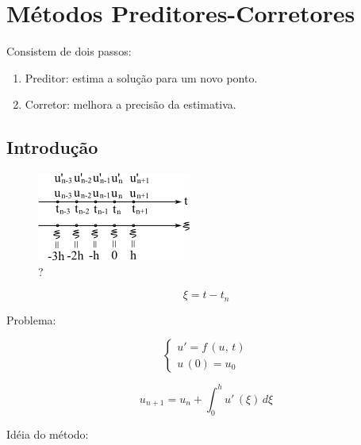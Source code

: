 \section{Métodos Preditores-Corretores}

Consistem de dois passos:

\begin{enumerate}
 \item Preditor: estima a solução para um novo ponto.
 \item Corretor: melhora a precisão da estimativa.
\end{enumerate}

\subsection{Introdução}

\begin{figure}[htb]
 \centering
 \includegraphics[scale=1.0]{capitulos/capitulo6/figuras/met_pred_corretores1.png}
 \caption{?}
 \label{fig:met_pred_corretores1}
\end{figure}

\begin{equation}
 \label{cap6:sec4:eq1}
 \xi = t - t_n
\end{equation}

Problema:

\begin{equation}
 \label{cap6:sec4:eq2}
 \left\{
 \begin{array}{l}
  u' = f \, (u, \, t) \\
  u \, (0) = u_0
 \end{array}
 \right.
\end{equation}

\begin{equation}
 \label{cap6:sec4:eq3}
 u_{n+1} = u_n + \int_0^h u' \, (\xi) \, d\xi
\end{equation}

Idéia do método:

